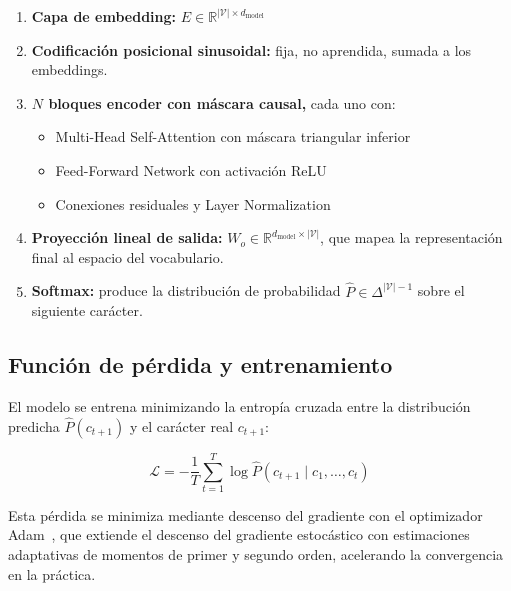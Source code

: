 \begin{enumerate}
    \item \textbf{Capa de embedding:}
    $E \in \mathbb{R}^{|\mathcal{V}| \times d_{\text{model}}}$

    \item \textbf{Codificación posicional sinusoidal:}
    fija, no aprendida, sumada a los embeddings.

    \item \textbf{$N$ bloques encoder con máscara causal,}
    cada uno con:
    \begin{itemize}
        \item Multi-Head Self-Attention con máscara triangular inferior
        \item Feed-Forward Network con activación ReLU
        \item Conexiones residuales y Layer Normalization
    \end{itemize}

    \item \textbf{Proyección lineal de salida:}
    $W_o \in \mathbb{R}^{d_{\text{model}} \times |\mathcal{V}|}$,
    que mapea la representación final al espacio del vocabulario.

    \item \textbf{Softmax:} produce la distribución de probabilidad
    $\hat{P} \in \Delta^{|\mathcal{V}|-1}$ sobre el siguiente carácter.
\end{enumerate}



\subsection{Función de pérdida y entrenamiento}
\label{subsec:entrenamiento}

El modelo se entrena minimizando la entropía cruzada entre la
distribución predicha $\hat{P}(c_{t+1})$ y el carácter real $c_{t+1}$:

\begin{equation}
    \mathcal{L} = -\frac{1}{T} \sum_{t=1}^{T}
    \log \hat{P}(c_{t+1} \mid c_1, \ldots, c_t)
\end{equation}

Esta pérdida se minimiza mediante descenso del gradiente con el
optimizador Adam~\cite{goodfellow2016deeplearning}, que extiende el
descenso del gradiente estocástico con estimaciones adaptativas de
momentos de primer y segundo orden, acelerando la convergencia en la
práctica.

